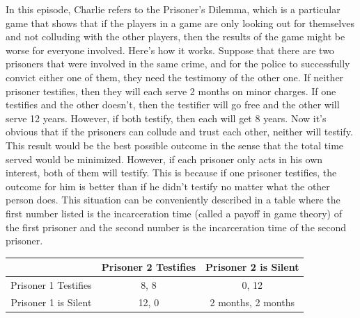 

In this episode, Charlie refers to the Prisoner's Dilemma, which is a particular game that shows that if the players in a game are only looking out for themselves and not colluding with the other players, then the results of the game might be worse for everyone involved. Here's how it works. Suppose that there are two prisoners that were involved in the same crime, and for the police to successfully convict either one of them, they need the testimony of the other one. If neither prisoner testifies, then they will each serve 2 months on minor charges. If one testifies and the other doesn't, then the testifier will go free and the other will serve 12 years. However, if both testify, then each will get 8 years. Now it's obvious that if the prisoners can collude and trust each other, neither will testify. This result would be the best possible outcome in the sense that the total time served would be minimized. However, if each prisoner only acts in his own interest, both of them will testify. This is because if one prisoner testifies, the outcome for him is better than if he didn't testify no matter what the other person does. This situation can be conveniently described in a table where the first number listed is the incarceration time (called a payoff in game theory) of the first prisoner and the second number is the incarceration time of the second prisoner. \\

	\begin{table}[H]
	\centering
	\begin{tabular}{c|c|c}
	 & Prisoner 2 Testifies & Prisoner 2 is Silent \\ \hline
	 Prisoner 1 Testifies & 8, 8 & 0, 12 \\ \hline
	 Prisoner 1 is Silent & 12, 0 & 2 months, 2 months
	\end{tabular}
	\end{table}


